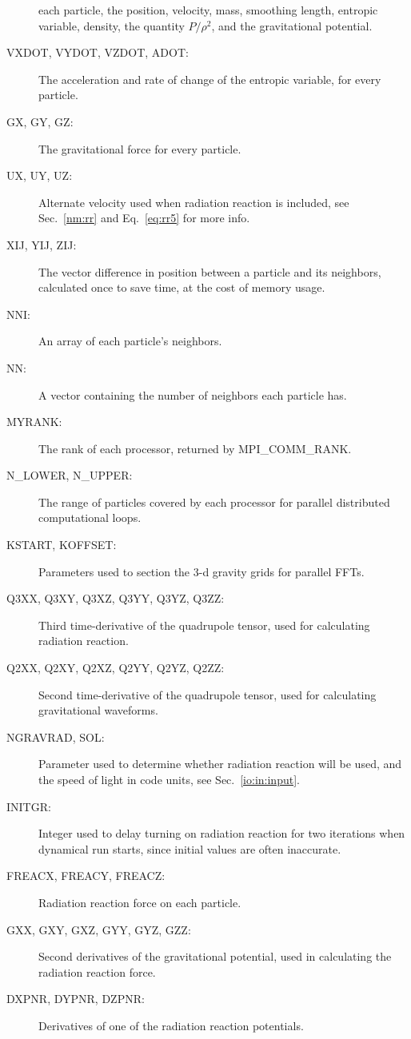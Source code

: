 \begin{description}
each particle, the position, velocity, mass, smoothing length,
entropic variable, density, the quantity $P/\rho^2$, and the
gravitational potential.
\item[VXDOT, VYDOT, VZDOT, ADOT:] The acceleration and rate of change of
the entropic variable, for every particle.
\item[GX, GY, GZ:] The gravitational force for every particle.
\item[UX, UY, UZ:] Alternate velocity used when radiation reaction is
included, see Sec.~\ref{nm:rr} and Eq.~\ref{eq:rr5} for more info.
\item[XIJ, YIJ, ZIJ:] The vector difference in position between a
particle and its neighbors, calculated once to save time, at the cost
of memory usage.
\item[NNI:] An array of each particle's neighbors.
\item[NN:] A vector containing the number of neighbors each particle
has.
\item[MYRANK:] The rank of each processor, returned by
MPI\_COMM\_RANK.
\item[N\_LOWER, N\_UPPER:] The range of particles covered by each
processor for parallel distributed computational loops.
\item[KSTART, KOFFSET:] Parameters used to section the 3-d gravity
grids for parallel FFTs.
\item[Q3XX, Q3XY, Q3XZ, Q3YY, Q3YZ, Q3ZZ:]Third time-derivative of the
quadrupole tensor, used for calculating radiation reaction.
\item[Q2XX, Q2XY, Q2XZ, Q2YY, Q2YZ, Q2ZZ:]Second time-derivative of the
quadrupole tensor, used for calculating gravitational waveforms.
\item[NGRAVRAD, SOL:] Parameter used to determine whether radiation
reaction will be used, and the speed of light in code units, 
see Sec.~\ref{io:in:input}.
\item[INITGR:] Integer used to delay turning on radiation reaction for
two iterations when dynamical run starts, since initial values are
often inaccurate.
\item[FREACX, FREACY, FREACZ:] Radiation reaction force on each
particle.
\item[GXX, GXY, GXZ, GYY, GYZ, GZZ:] Second derivatives of the
gravitational potential, used in calculating the radiation reaction
force.
\item[DXPNR, DYPNR, DZPNR:] Derivatives of one of the radiation reaction
potentials.
\end{description}


